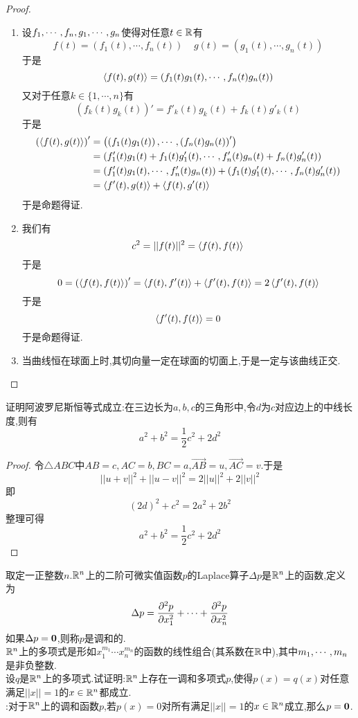 \documentclass{ctexart}
\begin{document}
\begin{proof}
    \begin{enumerate}[label=\tbf{(\arabic*)}]
        \item 设${f}_1,\cdots,{f}_{n},{g}_1,\cdots,{g}_{n}$使得对任意$t\in\mathbb{R}$有
            \[f(t)=\left(f_1(t),\cdots,f_n(t)\right)\ \ \ \ \ g(t)=\left(g_1(t),\cdots,g_n(t)\right)\]
            于是
            \[\left\langle{f(t)},{g(t)}\right\rangle=\left(f_1(t)g_1(t),\cdots,f_n(t)g_n(t)\right)\]
            又对于任意$k\in\{1,\cdots,n\}$有
            \[\left(f_k(t)g_k(t)\right)'=f'_k(t)g_k(t)+f_k(t)g'_k(t)\]
            于是
            \[\begin{aligned}
                \left(\left\langle{f(t)},{g(t)}\right\rangle\right)'
                &= \left(\left(f_1(t)g_1(t)\right),\cdots,\left(f_n(t)g_n(t)\right)'\right) \\
                &= \left(f'_1(t)g_1(t)+f_1(t)g'_1(t),\cdots,f'_n(t)g_n(t)+f_n(t)g'_n(t)\right) \\
                &= \left(f'_1(t)g_1(t),\cdots,f'_n(t)g_n(t)\right)+\left(f_1(t)g'_1(t),\cdots,f_n(t)g'_n(t)\right) \\
                &= \left\langle{f'(t)},{g(t)}\right\rangle+\left\langle{f(t)},{g'(t)}\right\rangle
            \end{aligned}\]
            于是命题得证.
        \item 我们有
            \[c^2=||f(t)||^2=\left\langle{f(t)},{f(t)}\right\rangle\]
            于是
            \[0=\left(\left\langle{f(t)},{f(t)}\right\rangle\right)'=\left\langle{f(t)},{f'(t)}\right\rangle+\left\langle{f'(t)},{f(t)}\right\rangle=2\left\langle{f'(t)},{f(t)}\right\rangle\]
            于是
            \[\left\langle{f'(t)},{f(t)}\right\rangle=0\]
            于是命题得证.
        \item 当曲线恒在球面上时,其切向量一定在球面的切面上,于是一定与该曲线正交.
    \end{enumerate}
\end{proof}
\begin{problem}[34.]
    证明阿波罗尼斯恒等式成立:在三边长为$a,b,c$的三角形中,令$d$为$c$对应边上的中线长度,则有
    \[a^2+b^2=\dfrac12c^2+2d^2\]
\end{problem}
\begin{proof}
    令$\triangle ABC$中$AB=c,AC=b,BC=a$,$\overrightarrow{AB}=u,\overrightarrow{AC}=v$.于是
    \[||u+v||^2+||u-v||^2=2||u||^2+2||v||^2\]
    即
    \[\left(2d\right)^2+c^2=2a^2+2b^2\]
    整理可得
    \[a^2+b^2=\dfrac12c^2+2d^2\]
\end{proof}
\begin{problem}[35.]
    取定一正整数$n$.$\mathbb{R}^n$上的二阶可微实值函数$p$的Laplace算子$\Delta p$是$\mathbb{R}^n$上的函数,定义为
    \[\Delta p=\dfrac{\partial^2p}{\partial x_1^2}+\cdots+\dfrac{\partial^2 p}{\partial x_n^2}\]
    如果$\Delta p=\mathbf0$,则称$p$是调和的.\\
    $\mathbb{R}^n$上的多项式是形如$x_1^{m_1}\cdots x_n^{m_n}$的函数的线性组合(其系数在$\mathbb{R}$中),其中${m}_1,\cdots,{m}_{n}$是非负整数.\\
    设$q$是$\mathbb{R}^n$上的多项式.试证明:$\mathbb{R}^n$上存在一调和多项式$p$,使得$p(x)=q(x)$对任意满足$||x||=1$的$x\in\mathbb{R}^n$都成立.\\
    :对于$\mathbb{R}^n$上的调和函数$p$,若$p(x)=0$对所有满足$||x||=1$的$x\in\mathbb{R}^n$成立,那么$p=\mathbf0$.
\end{problem}
\end{document}
